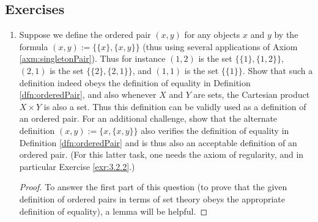 \documentclass[../main.tex]{subfiles}
\begin{document}
\subsection*{Exercises}
\begin{enumerate}[ref={\thesection.\arabic*}]
    \item \label{exr:3.5.1}Suppose we define the ordered pair $(x,y)$ for any objects $x$ and $y$ by the formula $(x,y):=\{\{x\},\{x,y\}\}$ (thus using several applications of Axiom \ref{axm:singletonPair}). Thus for instance $(1,2)$ is the set $\{\{1\},\{1,2\}\}$, $(2,1)$ is the set $\{\{2\},\{2,1\}\}$, and $(1,1)$ is the set $\{\{1\}\}$. Show that such a definition indeed obeys the definition of equality in Definition \ref{dfn:orderedPair}, and also whenever $X$ and $Y$ are sets, the Cartesian product $X\times Y$ is also a set. Thus this definition can be validly used as a definition of an ordered pair. For an additional challenge, show that the alternate definition $(x,y):=\{x,\{x,y\}\}$ also verifies the definition of equality in Definition \ref{dfn:orderedPair} and is thus also an acceptable definition of an ordered pair. (For this latter task, one needs the axiom of regularity, and in particular Exercise \ref{exr:3.2.2}.)
    \begin{proof}
        To answer the first part of this question (to prove that the given definition of ordered pairs in terms of set theory obeys the appropriate definition of equality), a lemma will be helpful.

\end{proof}
\end{enumerate}
\end{document}
